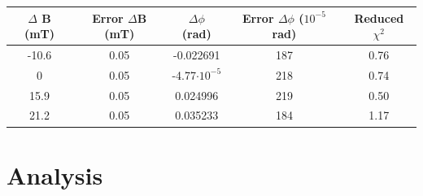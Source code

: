 \documentclass[prb,preprint]{revtex4-1}
\begin{document}
\begin{ruledtabular}
\begin{tabular}{ccccc}
$\Delta$ B (mT) & Error $\Delta$B (mT)& $\Delta \phi$ (rad) & Error $\Delta\phi$ ($10^{-5}$ rad) & Reduced $\chi^2$ \\  \hline
-10.6 & 0.05 & -0.022691 & 187 & 0.76 \\
0     & 0.05 & -4.77$\cdot10^{-5}$ & 218 & 0.74 \\
15.9  & 0.05 & 0.024996  & 219 & 0.50 \\
21.2  & 0.05 & 0.035233  & 184 & 1.17
\end{tabular}
\end{ruledtabular}


\section{Analysis}
\end{document}
